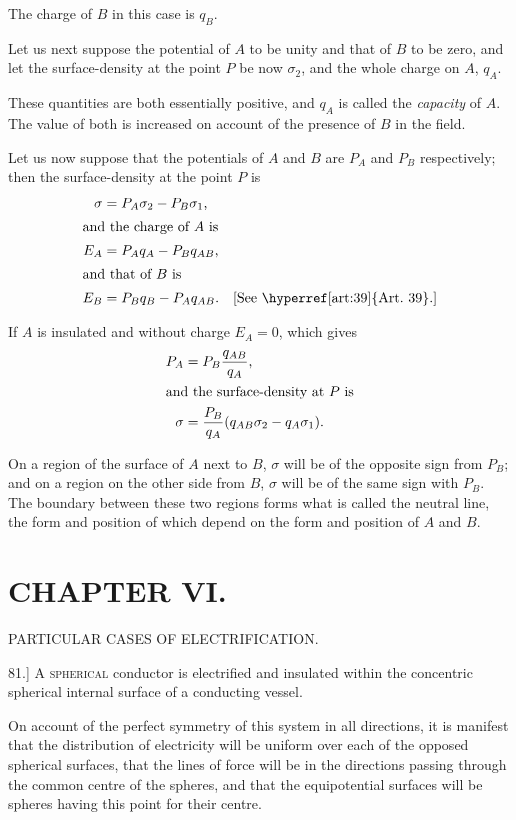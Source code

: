 \documentclass[12pt,oneside]{book}[2021/10/04]
\newcommand{\Heading}{\centering\normalfont}
\newcommand{\Chapter}[1]{\section*{\large\Heading #1}}
\newcommand{\Subheading}[1]{\begin{center}\small #1 \end{center}}
\newcommand{\article}[1]{\phantomsection \label{art:#1}{#1.]}}
\newcommand{\¬}{\hphantom{0}}
\newcommand{\newchapter}{\newpage\thispagestyle{empty}}
\begin{document}
The charge of \(B\) in this case is \(q_B\).

Let us next suppose the potential of \(A\) to be unity and that of \(B\)
to be zero, and let the surface-density at the point \(P\) be now \(\sigma_2\), and
the whole charge on \(A\), \(q_A\).

These quantities are both essentially positive, and \(q_A\) is called
the \textit{capacity} of \(A\). The value of both is increased on account of
the presence of \(B\) in the field.

Let us now suppose that the potentials of \(A\) and \(B\) are \(P_A\) and
\(P_B\) respectively; then the surface-density at the point \(P\) is
\begin{align*}
\sigma &= P_A  \sigma _2 - P_B \sigma _1\text{,}\\
\shortintertext{and the charge of \(A\) is}
E_A &= P_A q_A - P_B q_{AB}\text{,}\\
\shortintertext{and that of \(B\) is}
E_B &= P_Bq_B - P_A q_{AB}\text{.\quad [See \hyperref[art:39]{Art.\ 39}.]}
\end{align*}

If \(A\) is insulated and without charge \(E_A = 0\), which gives
\begin{align*}
P_A &= P_B \frac{q_{AB}}{q_A}\text{,}\\
\shortintertext{and the surface-density at \(P\) is}
\sigma &= \frac{P_B}{q_A}(q_{AB}  \sigma _2 - q_A \sigma _1)\text{.}
\end{align*}

On a region of the surface of \(A\) next to \(B\), \(\sigma\) will be of the
opposite sign from \(P_B\); and on a region on the other side from \(B\),
\(\sigma\) will be of the same sign with \(P_B\). The boundary between these
two regions forms what is called the neutral line, the form and
position of which depend on the form and position of \(A\) and \(B\).

\newchapter
\Chapter{CHAPTER VI.}

\Subheading{PARTICULAR CASES OF ELECTRIFICATION.}

\article{81} \textsc{A spherical} conductor is electrified and insulated within
the concentric spherical internal surface of a conducting vessel.

On account of the perfect symmetry of this system in all directions,
it is manifest that the distribution of electricity will be
uniform over each of the opposed spherical surfaces, that the lines
of force will be in the directions passing through the common
centre of the spheres, and that the equipotential surfaces will be
spheres having this point for their centre.
\end{document}
